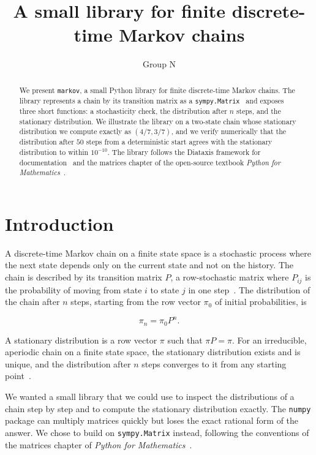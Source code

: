 \documentclass[11pt]{article}
\title{A small library for finite discrete-time Markov chains}
\author{Group N}
\date{}
\begin{document}
\maketitle

\begin{abstract}
We present \texttt{markov}, a small Python library for finite
discrete-time Markov chains. The library represents a chain by its
transition matrix as a \texttt{sympy.Matrix}~\cite{meurer2017} and
exposes three short functions: a stochasticity check, the distribution
after \(n\) steps, and the stationary distribution. We illustrate the
library on a two-state chain whose stationary distribution we compute
exactly as \((4/7, 3/7)\), and we verify numerically that the
distribution after \(50\) steps from a deterministic start agrees with
the stationary distribution to within \(10^{-10}\). The library follows
the Diataxis framework for documentation~\cite{procida2017} and the
matrices chapter of the open-source textbook \emph{Python for
Mathematics}~\cite{knight2024}.
\end{abstract}

\section{Introduction}

A discrete-time Markov chain on a finite state space is a stochastic
process where the next state depends only on the current state and not
on the history. The chain is described by its transition matrix \(P\),
a row-stochastic matrix where \(P_{ij}\) is the probability of moving
from state \(i\) to state \(j\) in one step~\cite{norris1998}. The
distribution of the chain after \(n\) steps, starting from the row
vector \(\pi_0\) of initial probabilities, is

\[
    \pi_n = \pi_0 P^n.
\]

A stationary distribution is a row vector \(\pi\) such that
\(\pi P = \pi\). For an irreducible, aperiodic chain on a finite state
space, the stationary distribution exists and is unique, and the
distribution after \(n\) steps converges to it from any starting
point~\cite{norris1998}.

We wanted a small library that we could use to inspect the
distributions of a chain step by step and to compute the stationary
distribution exactly. The \texttt{numpy} package can multiply matrices
quickly but loses the exact rational form of the answer. We chose to
build on \texttt{sympy.Matrix} instead, following the conventions of
the matrices chapter of \emph{Python for
Mathematics}~\cite{knight2024}.
\end{document}
